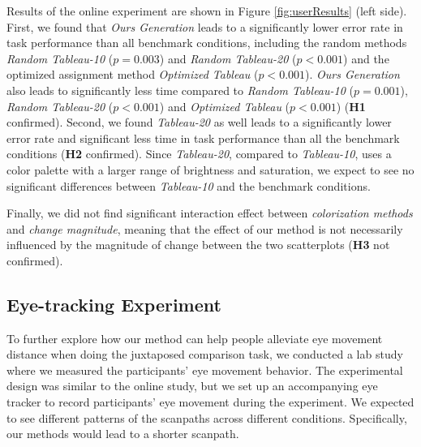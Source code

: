 Results of the online experiment are shown in Figure \ref{fig:userResults} (left side).
First, we found that \emph{Ours Generation} leads to a significantly lower error rate in task performance than all benchmark conditions, including the random methods \emph{Random Tableau-10} (\emph{$p = 0.003$}) and \emph{Random Tableau-20} (\emph{$p < 0.001$}) and the optimized assignment method \emph{Optimized Tableau} (\emph{$p < 0.001$}). \emph{Ours Generation} also leads to significantly less time compared to \emph{Random Tableau-10} (\emph{$p = 0.001$}), \emph{Random Tableau-20} (\emph{$p < 0.001$}) and \emph{Optimized Tableau} (\emph{$p < 0.001$}) (\textbf{H1} confirmed).
Second, we found \emph{Tableau-20} as well leads to a significantly lower error rate and significant less time in task performance than all the benchmark conditions (\textbf{H2} confirmed). Since \emph{Tableau-20}, compared to \emph{Tableau-10}, uses a color palette with a larger range of brightness and saturation, we expect to see no significant differences between \emph{Tableau-10} and the benchmark conditions.

Finally, we did not find significant interaction effect between \emph{colorization methods} and \emph{change magnitude}, meaning that the effect of our method is not necessarily influenced by the magnitude of change between the two scatterplots (\textbf{H3} not confirmed).


\subsection{Eye-tracking Experiment}
\label{subsec:labstudy}
To further explore how our method can help people alleviate eye movement distance when doing the juxtaposed comparison task, we conducted a lab study where we measured the participants' eye movement behavior.
The experimental design was similar to the online study, but we set up an accompanying eye tracker to record participants' eye movement during the experiment.
We expected to see different patterns of the scanpaths across different conditions. Specifically, our methods would lead to a shorter scanpath.



